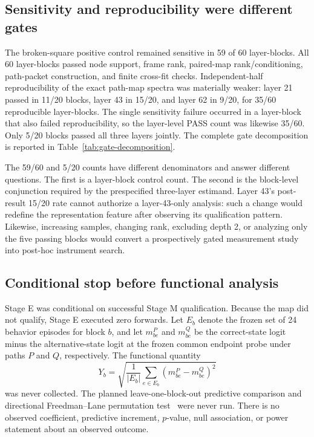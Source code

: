\documentclass[10pt,a4paper]{article}
\begin{document}
\subsection{Sensitivity and reproducibility were different gates}

The broken-square positive control remained sensitive in 59 of 60 layer-blocks. All 60 layer-blocks passed node support, frame rank, paired-map rank/conditioning, path-packet construction, and finite cross-fit checks. Independent-half reproducibility of the exact path-map spectra was materially weaker: layer 21 passed in 11/20 blocks, layer 43 in 15/20, and layer 62 in 9/20, for 35/60 reproducible layer-blocks. The single sensitivity failure occurred in a layer-block that also failed reproducibility, so the layer-level PASS count was likewise 35/60. Only 5/20 blocks passed all three layers jointly. The complete gate decomposition is reported in Table~\ref{tab:gate-decomposition}.

The 59/60 and 5/20 counts have different denominators and answer different questions. The first is a layer-block control count. The second is the block-level conjunction required by the prespecified three-layer estimand. Layer 43's post-result 15/20 rate cannot authorize a layer-43-only analysis: such a change would redefine the representation feature after observing its qualification pattern. Likewise, increasing samples, changing rank, excluding depth 2, or analyzing only the five passing blocks would convert a prospectively gated measurement study into post-hoc instrument search.

\subsection{Conditional stop before functional analysis}

Stage E was conditional on successful Stage M qualification. Because the map did not qualify, Stage E executed zero forwards. Let $E_b$ denote the frozen set of 24 behavior episodes for block $b$, and let $m^P_{be}$ and $m^Q_{be}$ be the correct-state logit minus the alternative-state logit at the frozen common endpoint probe under paths $P$ and $Q$, respectively. The functional quantity
\begin{equation}
  Y_b=\sqrt{\frac{1}{|E_b|}\sum_{e\in E_b}
  \left(m^P_{be}-m^Q_{be}\right)^2}
  \label{eq:Yb}
\end{equation}
was never collected. The planned leave-one-block-out predictive comparison and directional Freedman--Lane permutation test~\cite{freedmanlane1983} were never run. There is no observed coefficient, predictive increment, $p$-value, null association, or power statement about an observed outcome.
\end{document}
